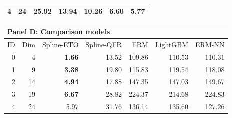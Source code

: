 \begin{table}[htbp]
\begin{tabular}{rrrrrrr}
4 & 24 & 25.92 & 13.94 & 10.26 & 6.60 & \textbf{5.77} \\
\bottomrule
\end{tabular}
\par\medskip
\begin{tabular}{rrrrrrr}
\toprule
\multicolumn{7}{l}{\textbf{Panel D: Comparison models}} \\
\midrule
ID & Dim & Spline-ETO & Spline-QFR & ERM & LightGBM & ERM-NN \\
\midrule
0 & 4 & \textbf{1.66} & 13.52 & 109.86 & 110.53 & 110.31 \\
1 & 9 & \textbf{3.38} & 19.80 & 115.83 & 119.54 & 118.08 \\
2 & 14 & \textbf{4.94} & 17.88 & 147.35 & 147.03 & 149.67 \\
3 & 19 & \textbf{6.67} & 28.82 & 224.37 & 214.68 & 224.83 \\
4 & 24 & 5.97 & 31.76 & 136.14 & 135.60 & 127.26 \\
\bottomrule
\end{tabular}
\end{table}
